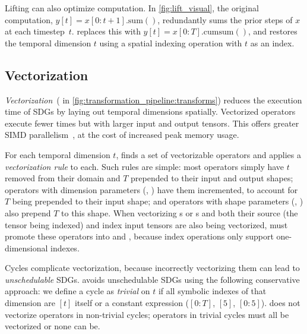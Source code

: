 Lifting can also optimize computation. In \F\ref{fig:lift_visual}, the original computation, $y[t]\!=\!x[0\!:\!t\!+\!1]\mathrm{.sum}()$, redundantly sums the prior steps of $x$ at each timestep~$t$. \sys{} replaces this with $y[t]\!=\!x[0\!:\!T]\mathrm{.cumsum()}$, and restores the temporal dimension $t$ using a spatial indexing operation with $t$ as an index.



\subsection{Vectorization}
\label{sec:vectorization}

\emph{Vectorization}~( in \F\ref{fig:transformation_pipeline:transforms}) reduces the execution time of SDGs by laying out temporal dimensions spatially. Vectorized operators execute fewer times but with larger input and output tensors. This offers greater SIMD parallelism~\cite{flynn2005very}, at the cost of increased peak memory usage.

For each temporal dimension $t$, \sys{} finds a set of vectorizable operators and applies a \emph{vectorization rule} to each. 
Such rules are simple: most operators simply have $t$ removed from their domain and $T$ prepended to their input and output shapes; operators with dimension parameters (\eg {}, ) have them incremented, to account for $T$ being prepended to their input shape; and operators with shape parameters (\eg {}, ) also prepend $T$ to this shape.
When vectorizing s or s and both their source (\ie the tensor being indexed) and index input tensors are also being vectorized, \sys{} must promote these operators into  and , because index operations only support one-dimensional indexes.


Cycles complicate vectorization, because incorrectly vectorizing them can lead to \emph{unschedulable} SDGs. 
\sys{} avoids unschedulable SDGs using the following conservative approach: we define a cycle as \emph{trivial} on $t$ if all symbolic indexes of that dimension are $[t]$ itself or a constant expression (\eg $[0:T]$, $[5]$, $[0:5]$). \sys does not vectorize operators in non-trivial cycles; operators in trivial cycles must all be vectorized or none can be.


